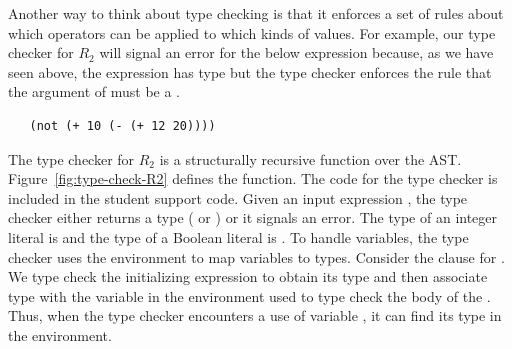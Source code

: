\documentclass[11pt]{book}
\begin{document}
Another way to think about type checking is that it enforces a set of
rules about which operators can be applied to which kinds of
values. For example, our type checker for $R_2$ will signal an error
for the below expression because, as we have seen above, the
expression  has type  but the type
checker enforces the rule that the argument of  must be a
.
\begin{lstlisting}
   (not (+ 10 (- (+ 12 20))))
\end{lstlisting}

The type checker for $R_2$ is a structurally recursive function over
the AST. Figure~\ref{fig:type-check-R2} defines the
 function. The code for the type checker is
included in the student support code.
%
Given an input expression , the type checker either returns a
type ( or ) or it signals an error.  The
type of an integer literal is  and the type of a Boolean
literal is .  To handle variables, the type checker uses
the environment  to map variables to types. Consider the
clause for .  We type check the initializing expression to
obtain its type  and then associate type  with the
variable  in the environment used to type check the body of
the . Thus, when the type checker encounters a use of
variable , it can find its type in the environment.
\end{document}
